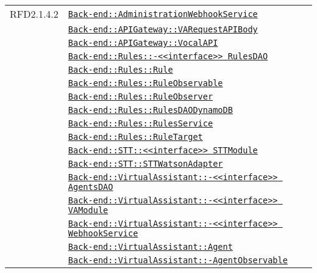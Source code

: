 \begin{longtable}{|>{\centering}m{3cm}|m{10cm}<{\centering}|}
RFD2.1.4.2 & \hyperref[Back-end::AdministrationWebhookService]{\texttt{Back-end::AdministrationWebhookService}}\\
& \hyperref[Back-end::APIGateway::VARequestAPIBody]{\texttt{Back-end::APIGateway::VARequestAPIBody}}\\
& \hyperref[Back-end::APIGateway::VocalAPI]{\texttt{Back-end::APIGateway::VocalAPI}}\\
& \hyperref[Back-end::Rules::<<interface>> RulesDAO]{\texttt{Back-end::Rules::-\linebreak <<interface>> RulesDAO}}\\
& \hyperref[Back-end::Rules::Rule]{\texttt{Back-end::Rules::Rule}}\\
& \hyperref[Back-end::Rules::RuleObservable]{\texttt{Back-end::Rules::RuleObservable}}\\
& \hyperref[Back-end::Rules::RuleObserver]{\texttt{Back-end::Rules::RuleObserver}}\\
& \hyperref[Back-end::Rules::RulesDAODynamoDB]{\texttt{Back-end::Rules::RulesDAODynamoDB}}\\
& \hyperref[Back-end::Rules::RulesService]{\texttt{Back-end::Rules::RulesService}}\\
& \hyperref[Back-end::Rules::RuleTarget]{\texttt{Back-end::Rules::RuleTarget}}\\
& \hyperref[Back-end::STT::<<interface>> STTModule]{\texttt{Back-end::STT::<<interface>> STTModule}}\\
& \hyperref[Back-end::STT::STTWatsonAdapter]{\texttt{Back-end::STT::STTWatsonAdapter}}\\
& \hyperref[Back-end::VirtualAssistant::<<interface>> AgentsDAO]{\texttt{Back-end::VirtualAssistant::-\linebreak <<interface>> AgentsDAO}}\\
& \hyperref[Back-end::VirtualAssistant::<<interface>> VAModule]{\texttt{Back-end::VirtualAssistant::-\linebreak <<interface>> VAModule}}\\
& \hyperref[Back-end::VirtualAssistant::<<interface>> WebhookService]{\texttt{Back-end::VirtualAssistant::-\linebreak <<interface>> WebhookService}}\\
& \hyperref[Back-end::VirtualAssistant::Agent]{\texttt{Back-end::VirtualAssistant::Agent}}\\
& \hyperref[Back-end::VirtualAssistant::AgentObservable]{\texttt{Back-end::VirtualAssistant::-\linebreak AgentObservable}}\\

\end{longtable}
